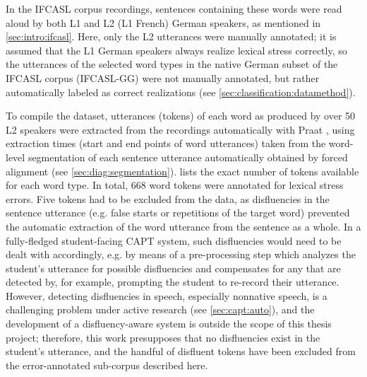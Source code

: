 	In the IFCASL corpus recordings, sentences containing these words were read aloud by both L1 and L2 (L1 French) German speakers, as mentioned in \cref{sec:intro:ifcasl}. Here, only the L2 utterances were manually annotated; it is assumed that the L1 German speakers always realize lexical stress correctly, so the utterances of the selected word types in the native German subset of the IFCASL corpus (IFCASL-GG) were not manually annotated, but rather automatically labeled as correct realizations (see \cref{sec:classification:datamethod}).
	
	
	To compile the dataset, utterances (tokens) of each word as produced by over 50 L2 speakers were extracted from the recordings automatically with Praat \parencite{Boersma2014}, using extraction times (start and end points of word utterances) taken from the word-level segmentation of each sentence utterance automatically obtained by forced alignment (see \cref{sec:diag:segmentation}).
	 lists the exact number of tokens available for each word type. In total, 
	668 word tokens were annotated for lexical stress errors. 
	Five tokens had to be excluded from the data, as disfluencies in the sentence utterance (e.g. false starts or repetitions of the target word) prevented the automatic extraction of the word utterance from the sentence as a whole. In a fully-fledged student-facing CAPT system, such disfluencies would need to be dealt with accordingly, e.g. by means of a pre-processing step which analyzes the student's utterance for possible disfluencies and compensates for any that are detected by, for example, prompting the student to re-record their utterance. However, detecting disfluencies in speech, especially nonnative speech, is a challenging problem under active research 
	(see \cref{sec:capt:auto}),
	and the development of a  disfluency-aware system is outside the scope of this thesis project; therefore, this work presupposes that no disfluencies exist in the student's utterance, and the handful of disfluent tokens have been excluded from the error-annotated sub-corpus described here.
	

